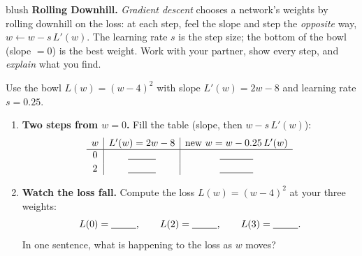 \documentclass[10pt]{article}
\begin{document}
\namepartnerperiod

\vspace{0.10in}

\begin{headlinebox}{blush}
\small\textbf{Rolling Downhill.} \emph{Gradient descent} chooses a network's weights by rolling downhill on the
loss: at each step, feel the slope and step the \emph{opposite} way, $w\leftarrow w-s\,L'(w)$. The learning
rate $s$ is the step size; the bottom of the bowl (slope $=0$) is the best weight. Work with your partner, show
every step, and \emph{explain} what you find.
\end{headlinebox}

\vspace{0.10in}

\begin{tcolorbox}[colback=white, colframe=black!40, title=\textbf{Tier R --- Remediate},
    fonttitle=\bfseries, arc=1.5mm, left=3mm, right=3mm, top=2mm, bottom=2mm, breakable]
Use the bowl $L(w)=(w-4)^2$ with slope $L'(w)=2w-8$ and learning rate $s=0.25$.
\begin{enumerate}[leftmargin=1.7em, itemsep=8pt]
  \item \textbf{Two steps from $w=0$.} Fill the table (slope, then $w-s\,L'(w)$):
        \[ \begin{array}{c|c|c} w & L'(w)=2w-8 & \text{new } w=w-0.25\,L'(w)\\ \hline
            0 & \blank{1.0cm} & \blank{1.2cm}\\[2pt]
            2 & \blank{1.0cm} & \blank{1.2cm}\\ \end{array} \]
  \item \textbf{Watch the loss fall.} Compute the loss $L(w)=(w-4)^2$ at your three weights:
        \[ L(0)=\blank{0.9cm},\qquad L(2)=\blank{0.9cm},\qquad L(3)=\blank{0.9cm}. \]
        In one sentence, what is happening to the loss as $w$ moves? \writeline
\end{enumerate}
\end{tcolorbox}
\end{document}
